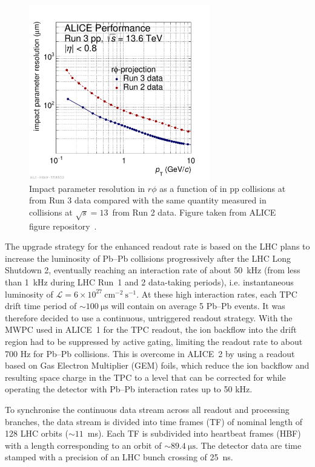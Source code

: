 \begin{figure}[htb]
    \centering
    \includegraphics[width=0.7\textwidth]{Figures/Chapter 3/sigmadcaxy_run2vsrun3data_qm.pdf}
    \caption{Impact parameter resolution in $r\phi$ as a function of \pt in pp collisions at \thirteen from Run 3 data compared with the same quantity measured in collisions at $\sqrt{s} = 13$~\tev from Run 2 data. Figure taken from ALICE figure repository~\cite{ALICE_figures}.}
    \label{fig:ITS_res}
\end{figure}

The upgrade strategy for the enhanced readout rate is based on the LHC plans to increase the luminosity of Pb--Pb collisions progressively after the LHC Long Shutdown 2, eventually reaching an interaction rate of about 50~kHz (from less than 1~kHz during LHC Run~1 and 2 data-taking periods), i.e. instantaneous luminosity of $\mathcal{L} = 6\times10^{27}~\mathrm{cm}^{-2}~\mathrm{s}^{-1}$. At these high interaction rates, each TPC drift time period of $\sim\SI{100}{\micro\second}$ will contain on average 5 Pb--Pb events. It was therefore decided to use a continuous, untriggered readout strategy. With the MWPC used in ALICE~1 for the TPC readout, the ion backflow into the drift region had to be suppressed by active gating, limiting the readout rate to about 700 Hz for Pb--Pb collisions. This is overcome in ALICE~2 by using a readout based on Gas Electron Multiplier (GEM) foils, which reduce the ion backflow and resulting space charge in the TPC to a level that can be corrected for while operating the detector with Pb--Pb interaction rates up to 50 kHz. 

To synchronise the continuous data stream across all readout and processing branches, the data stream is divided into time frames (TF) of nominal length of 128 LHC orbits ($\sim11$~ms). Each TF is subdivided into heartbeat frames (HBF) with a length corresponding to an orbit of $\sim\SI{89.4}{\micro\second}$. The detector data are time stamped with a precision of an LHC bunch crossing of 25~ns. 

